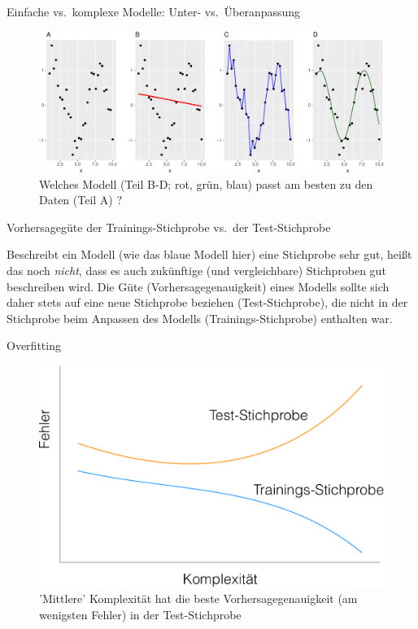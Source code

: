 \begin{frame}{Einfache vs.~komplexe Modelle: Unter- vs.~Überanpassung}

\begin{figure}

{\centering \includegraphics[width=0.9\linewidth]{PraDa_Folien_nm_2_files/figure-beamer/overfitting-4-plots-1} 

}

\caption{Welches Modell (Teil B-D; rot, grün, blau) passt am besten zu den Daten (Teil A) ?}\label{fig:overfitting-4-plots}
\end{figure}

\end{frame}

\begin{frame}{Vorhersagegüte der Trainings-Stichprobe vs.~der
Test-Stichprobe}

Beschreibt ein Modell (wie das blaue Modell hier) eine Stichprobe sehr
gut, heißt das noch \emph{nicht}, dass es auch zukünftige (und
vergleichbare) Stichproben gut beschreiben wird. Die Güte
(Vorhersagegenauigkeit) eines Modells sollte sich daher stets auf eine
neue Stichprobe beziehen (Test-Stichprobe), die nicht in der Stichprobe
beim Anpassen des Modells (Trainings-Stichprobe) enthalten war.

\end{frame}

\begin{frame}{Overfitting}

\begin{figure}

{\centering \includegraphics[width=0.5\linewidth]{../images/modellieren/overfitting} 

}

\caption{'Mittlere' Komplexität hat die beste Vorhersagegenauigkeit (am wenigsten Fehler) in der Test-Stichprobe}\label{fig:overfitting-schema}
\end{figure}

\end{frame}

